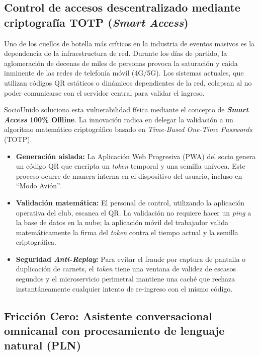 \subsection{Control de accesos descentralizado mediante criptografía TOTP (\textit{Smart Access})}

Uno de los cuellos de botella más críticos en la industria de eventos masivos es la dependencia de la infraestructura de red. Durante los días de partido, la aglomeración de decenas de miles de personas provoca la saturación y caída inminente de las redes de telefonía móvil (4G/5G). Los sistemas actuales, que utilizan códigos QR estáticos o dinámicos dependientes de la red, colapsan al no poder comunicarse con el servidor central para validar el ingreso.

SocioUnido soluciona esta vulnerabilidad física mediante el concepto de \textbf{\textit{Smart Access} 100\% Offline}. La innovación radica en delegar la validación a un algoritmo matemático criptográfico basado en \textit{Time-Based One-Time Passwords} (TOTP). 

\begin{itemize}
    \item \textbf{Generación aislada:} La Aplicación Web Progresiva (PWA) del socio genera un código QR que encripta un \textit{token} temporal y una semilla unívoca. Este proceso ocurre de manera interna en el dispositivo del usuario, incluso en ``Modo Avión''.
    \item \textbf{Validación matemática:} El personal de control, utilizando la aplicación operativa del club, escanea el QR. La validación no requiere hacer un \textit{ping} a la base de datos en la nube; la aplicación móvil del trabajador valida matemáticamente la firma del \textit{token} contra el tiempo actual y la semilla criptográfica.
    \item \textbf{Seguridad \textit{Anti-Replay}:} Para evitar el fraude por captura de pantalla o duplicación de carnets, el \textit{token} tiene una ventana de validez de escasos segundos y el microservicio perimetral mantiene una caché que rechaza instantáneamente cualquier intento de re-ingreso con el mismo código.
\end{itemize}

\subsection{Fricción Cero: Asistente conversacional omnicanal con procesamiento de lenguaje natural (PLN)}

